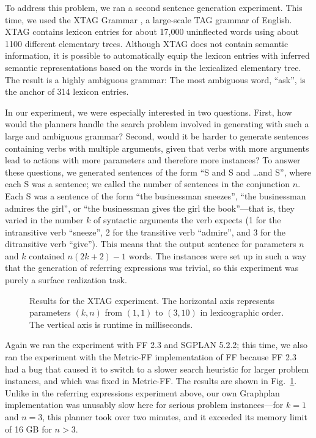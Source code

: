 To address this problem, we ran a second sentence generation
experiment. This time, we used the XTAG Grammar \citep{xtag01:_tr}, a
large-scale TAG grammar of English. XTAG contains lexicon entries for
about 17,000 uninflected words using about 1100 different elementary
trees. Although XTAG does not contain semantic information, it is
possible to automatically equip the lexicon entries with inferred
semantic representations based on the words in the lexicalized
elementary tree. The result is a highly ambiguous grammar: The most
ambiguous word, ``ask'', is the anchor of 314 lexicon entries.

In our experiment, we were especially interested in two
questions. First, how would the planners handle the search problem
involved in generating with such a large and ambiguous grammar?
Second, would it be harder to generate sentences containing verbs with
multiple arguments, given that verbs with more arguments lead to
actions with more parameters and therefore more instances? To answer
these questions, we generated sentences of the form ``S and S and
\ldots and S'', where each S was a sentence; we called the number of
sentences in the conjunction $n$. Each S was a sentence of the form
``the businessman sneezes'', ``the businessman admires the girl'', or
``the businessman gives the girl the book''---that is, they varied in
the number $k$ of syntactic arguments the verb expects (1 for the
intransitive verb ``sneeze'', 2 for the transitive verb ``admire'',
and 3 for the ditransitive verb ``give''). This means that the output
sentence for parameters $n$ and $k$ contained $n(2k+2)-1$ words. The
instances were set up in such a way that the generation of referring
expressions was trivial, so this experiment was purely a surface
realization task.

\begin{figure}
  \centering
  
  \caption{Results for the XTAG experiment. The horizontal axis
    represents parameters $(k,n)$ from $(1,1)$ to $(3,10)$ in
    lexicographic order. The vertical axis is runtime in milliseconds.}
  \label{fig:xtag-graph}
\end{figure}

Again we ran the experiment with FF 2.3 and SGPLAN 5.2.2; this time,
we also ran the experiment with the Metric-FF implementation of FF
because FF 2.3 had a bug that caused it to switch to a slower search
heuristic for larger problem instances, and which was fixed in
Metric-FF. The results are shown in
Fig.~\ref{fig:xtag-graph}. 
Unlike in the referring expressions experiment above, our own
Graphplan implementation was unusably slow here for serious problem
instances---for $k=1$ and $n=3$, this planner took over two minutes,
and it exceeded its memory limit of 16 GB for $n>3$. 






